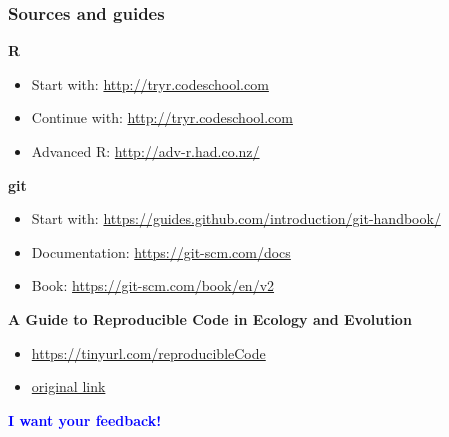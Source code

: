 \documentclass[xcolor=dvipsnames,xcolor=table, 14p]{beamer}
\begin{document}
\begin{frame}\frametitle{Sources and guides}
{\Large \bf R}
\begin{itemize}
    \item Start with:  \url{http://tryr.codeschool.com}
    \item Continue with: \url{http://tryr.codeschool.com}
    \item Advanced R: \url{http://adv-r.had.co.nz/}
\end{itemize}
{\Large \bf git}
\begin{itemize}
    \item Start with: \url{https://guides.github.com/introduction/git-handbook/}
    \item Documentation: \url{https://git-scm.com/docs}
    \item Book: \url{https://git-scm.com/book/en/v2}
\end{itemize}
{\large \bf A Guide to Reproducible Code in Ecology and Evolution}
\begin{itemize}
    \item \url{https://tinyurl.com/reproducibleCode}
    \item \href{https://www.britishecologicalsociety.org/wp-content/uploads/2017/12/guide-to-reproducible-code.pdf?fbclid=IwAR00qqChWaXk1o1_gjOtPkcD_y21n3BtLItdM07B8VyjmdrOLAHC6UEk0aQ}{original link}
\end{itemize}
\end{frame}

\begin{frame}{}
    \begin{center}
        \textcolor{blue}{\LARGE \bf I want your feedback!}
    \end{center}
\end{frame}
\end{document}
